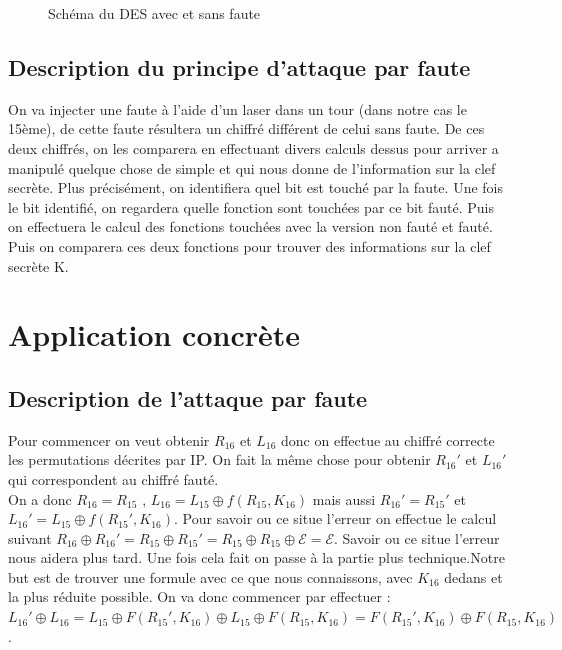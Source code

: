 \documentclass[a4paper,10pt]{report}
\begin{document}
\begin{figure}[h]
			
			\caption{Schéma du DES avec et sans faute}
			\end{figure}
		
			\section{Description du principe d'attaque par faute}
   On va injecter une faute à l'aide d'un laser dans un tour (dans notre cas le 15ème), de cette faute résultera un chiffré différent de celui sans faute.
De ces deux chiffrés, on les comparera en effectuant divers calculs dessus pour arriver a manipulé quelque chose de simple et qui nous donne de l'information sur la clef secrète.
Plus précisément, on identifiera quel bit est touché par la faute. Une fois le bit identifié, on regardera quelle fonction sont touchées par ce bit fauté.
Puis on effectuera le calcul des fonctions touchées avec la version non fauté et fauté. Puis on comparera ces deux fonctions pour trouver des informations sur la clef secrète K.
		\chapter{Application concrète}
			\section{Description de l'attaque par faute}
			Pour commencer on veut obtenir $R_{16}$ et $L_{16}$ donc on effectue au chiffré correcte les permutations décrites par IP. On fait la même chose pour obtenir $R_{16}'$ et $L_{16}'$ qui correspondent au chiffré fauté.\\
			On a donc $R_{16} = R_{15}$ , $L_{16} = L_{15}\oplus f(R_{15},K_{16})$ mais aussi $R_{16}'=R_{15}'$ et $L_{16}'=L_{15}\oplus f(R_{15}',K_{16})$.
			Pour savoir ou ce situe l'erreur on effectue le calcul suivant $R_{16}\oplus R_{16}' = R_{15}\oplus R_{15}' = R_{15}\oplus R_{15}\oplus \mathcal{E} = \mathcal{E}$. Savoir ou ce situe l'erreur nous aidera plus tard.
			\newline Une fois cela fait on passe à la partie plus technique.Notre but est de trouver une formule avec ce que nous connaissons, avec $K_{16}$ dedans et la plus réduite possible.
			On va donc commencer par effectuer :\\
			$L_{16}'\oplus L_{16} = L_{15}\oplus F(R_{15}',K_{16}) \oplus L_{15}\oplus F(R_{15},K_{16}) =F(R_{15}',K_{16})\oplus F(R_{15},K_{16})$.\\
			
\end{document}
